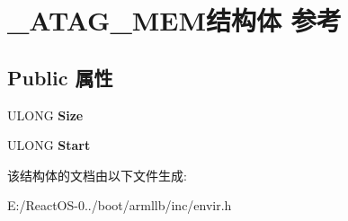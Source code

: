 \hypertarget{struct___a_t_a_g___m_e_m}{}\section{\+\_\+\+A\+T\+A\+G\+\_\+\+M\+E\+M结构体 参考}
\label{struct___a_t_a_g___m_e_m}
\subsection*{Public 属性}
\begin{DoxyCompactItemize}
\item 
\mbox{\label{struct___a_t_a_g___m_e_m_ae55df2db7d2a6849d29e462190188f97}} 
U\+L\+O\+NG {\bfseries Size}
\item 
\mbox{\label{struct___a_t_a_g___m_e_m_a1c098edd1b35766fb5cf793867fc5645}} 
U\+L\+O\+NG {\bfseries Start}
\end{DoxyCompactItemize}


该结构体的文档由以下文件生成\+:\begin{DoxyCompactItemize}
\item 
E\+:/\+React\+O\+S-\/0../boot/armllb/inc/envir.\+h\end{DoxyCompactItemize}
